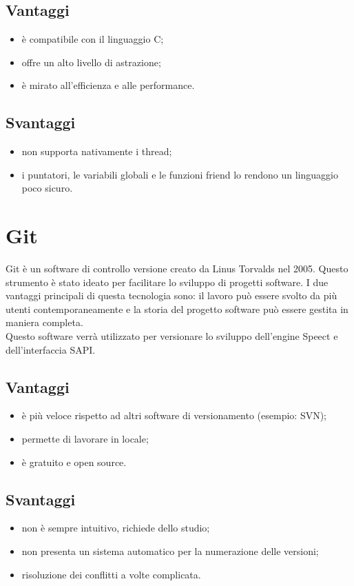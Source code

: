 \subsection*{Vantaggi}
\begin{itemize}
	\item è compatibile con il linguaggio C;
	\item offre un alto livello di astrazione;
	\item è mirato all'efficienza e alle performance.
\end{itemize}
\subsection*{Svantaggi}
\begin{itemize}
	\item non supporta nativamente i thread;
	\item i puntatori, le variabili globali e le funzioni friend lo rendono un linguaggio poco sicuro.
\end{itemize}
\section{Git}
Git è un software di controllo versione creato da Linus Torvalds nel 2005. Questo strumento è stato ideato per facilitare lo sviluppo di progetti software. I due vantaggi principali di questa tecnologia sono: il lavoro può essere svolto da più utenti contemporaneamente e la storia del progetto software può essere gestita in maniera completa.\\
Questo software verrà utilizzato per versionare lo sviluppo dell'engine Speect e dell'interfaccia SAPI.
\subsection*{Vantaggi}
\begin{itemize}
	\item è più veloce rispetto ad altri software di versionamento (esempio: SVN);
	\item permette di lavorare in locale;
	\item è gratuito e open source.
\end{itemize}
\subsection*{Svantaggi}
\begin{itemize}
	\item non è sempre intuitivo, richiede dello studio;
	\item non presenta un sistema automatico per la numerazione delle versioni;
	\item risoluzione dei conflitti a volte complicata.
\end{itemize}
